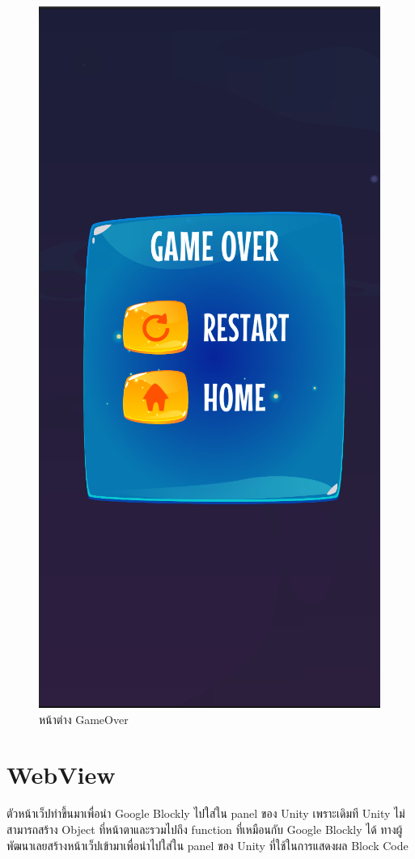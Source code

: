 \begin{figure}
\begin{center}
\includegraphics[scale = 0.4]{pic/gameover.PNG}
\end{center}
\caption[หน้าต่าง GameOver]{หน้าต่าง GameOver}
\label{lose}
\end{figure}



\section{WebView}
ตัวหน้าเว็ปทำขึ้นมาเพื่อนำ Google Blockly ไปใส่ใน panel ของ Unity เพราะเดิมที Unity ไม่สามารถสร้าง Object ที่หน้าตาและรวมไปถึง function ที่เหมือนกับ Google Blockly ได้ ทางผู้พัฒนาเลยสร้างหน้าเว็ปเข้ามาเพื่อนำไปใส่ใน 
panel ของ Unity ที่ใช้ในการแสดงผล Block Code


